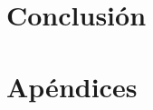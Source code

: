 \documentclass{article}
\begin{document}
\section{Conclusión}



\clearpage
\section{Apéndices}



\clearpage
\printbibliography

\end{document}
